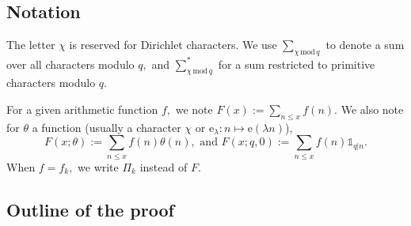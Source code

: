 \documentclass{article}
\newcommand{\Mod}{\,\mathrm{mod}\,}
\newcommand{\e}{\mathrm{e}}
\newcommand{\A}{\mathcal{A}}
\newcommand{\R}{\mathds{R}}
\newcommand{\Ind}{\mathbb{1}}
\newcommand{\eps}{\varepsilon}
\begin{document}
\subsection{Notation}\label{notation}

The letter $\chi$ is reserved for Dirichlet characters. We use $\sum_{\chi\Mod q}$ to denote a sum over all characters modulo $q,$ and $\sum_{\chi\Mod q}^*$ for a sum restricted to primitive characters modulo $q.$

For a given arithmetic function $f,$ we note $F(x) := \sum_{n\le x} f(n).$ We also note for $\theta$ a function (usually a character $\chi$ or $\e_\lambda : n\mapsto \e(\lambda n)$), $$F(x; \theta) := \sum_{n\le x} f(n) \theta(n),\text{ and } F(x; q, 0) := \sum_{n\le x} f(n) \Ind_{q|n}.$$
When $f = f_k,$ we write $\Pi_k$ instead of $F.$






\subsection{Outline of the proof}\label{sec-main-prop}
\end{document}
